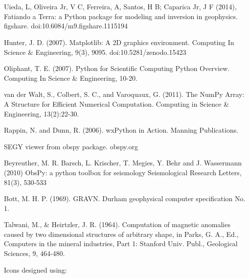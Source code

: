 \documentclass[a4paper,12pt,english]{sphinxmanual}
\begin{document}
\chapter{}
\label{\detokenize{references:references}}\label{\detokenize{references::doc}}\label{\detokenize{references:id1}}

Uieda, L, Oliveira Jr, V C, Ferreira, A, Santos, H B; Caparica Jr, J F (2014), Fatiando a Terra: a Python package for
modeling and inversion in geophysics. figshare. doi:10.6084/m9.figshare.1115194


Hunter, J. D. (2007). Matplotlib: A 2D graphics environment. Computing In Science \& Engineering, 9(3),
90\textendash{}95. doi:10.5281/zenodo.15423


Oliphant, T. E. (2007). Python for Scientific Computing Python Overview. Computing In Science \& Engineering, 10-20.


van der Walt, S., Colbert, S. C., and Varoquaux, G. (2011). The NumPy Array: A Structure for Efficient
Numerical Computation. Computing in Science \& Engineering, 13(2):22-30.


Rappin, N. and Dunn, R. (2006). wxPython in Action. Manning Publications.


SEGY viewer from obspy package. obspy.org

Beyreuther, M. R. Barsch, L. Krischer, T. Megies, Y. Behr and J. Wassermann (2010) ObsPy: a python toolbox for
seismology Seismological Research Letters, 81(3), 530-533


Bott, M. H. P. (1969). GRAVN. Durham geophysical computer specification No. 1.


Talwani, M., \& Heirtzler, J. R. (1964). Computation of magnetic anomalies caused by two dimensional structures of
arbitrary shape, in Parks, G. A., Ed., Computers in the mineral industries, Part 1: Stanford Univ. Publ., Geological
Sciences, 9, 464-480.


Icons designed using: 
\end{document}
